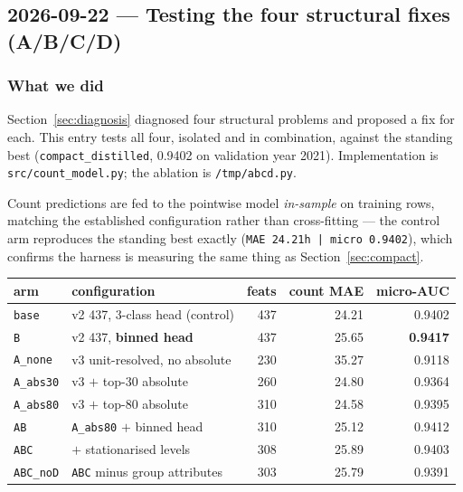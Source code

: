 \subsection{2026-09-22 --- Testing the four structural fixes (A/B/C/D)}
\label{sec:abcd}

\subsubsection*{What we did}

Section~\ref{sec:diagnosis} diagnosed four structural problems and proposed a fix for each. This
entry tests all four, isolated and in combination, against the standing best
(\texttt{compact\_distilled}, 0.9402 on validation year 2021). Implementation is
\texttt{src/count\_model.py}; the ablation is \texttt{/tmp/abcd.py}.

Count predictions are fed to the pointwise model \emph{in-sample} on training rows, matching the
established configuration rather than cross-fitting --- the control arm reproduces the standing
best exactly (\texttt{MAE 24.21h | micro 0.9402}), which confirms the harness is measuring the
same thing as Section~\ref{sec:compact}.

\begin{center}\small
\begin{tabular}{llrrr}
\toprule
arm & configuration & feats & count MAE & micro-AUC \\
\midrule
\texttt{base}    & v2 437, 3-class head (control)      & 437 & 24.21 & 0.9402 \\
\texttt{B}       & v2 437, \textbf{binned head}        & 437 & 25.65 & \textbf{0.9417} \\
\texttt{A\_none} & v3 unit-resolved, no absolute       & 230 & 35.27 & 0.9118 \\
\texttt{A\_abs30}& v3 $+$ top-30 absolute              & 260 & 24.80 & 0.9364 \\
\texttt{A\_abs80}& v3 $+$ top-80 absolute              & 310 & 24.58 & 0.9395 \\
\texttt{AB}      & \texttt{A\_abs80} $+$ binned head   & 310 & 25.12 & 0.9412 \\
\texttt{ABC}     & $+$ stationarised levels            & 308 & 25.89 & 0.9403 \\
\texttt{ABC\_noD}& \texttt{ABC} minus group attributes & 303 & 25.79 & 0.9391 \\
\bottomrule
\end{tabular}
\end{center}

